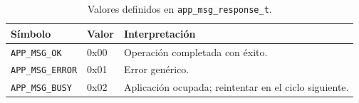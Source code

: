 \begin{table}[htbp]
    \centering
    \caption{Valores definidos en \texttt{app\_msg\_response\_t}.}
    \label{tab:app-msg-response}
    \begin{tabular}{llp{7cm}}
        \toprule
        \textbf{Símbolo} & \textbf{Valor} & \textbf{Interpretación} \\
        \midrule
        \texttt{APP\_MSG\_OK}    & 0x00 & Operación completada con éxito. \\
        \texttt{APP\_MSG\_ERROR} & 0x01 & Error genérico. \\
        \texttt{APP\_MSG\_BUSY}  & 0x02 & Aplicación ocupada; reintentar en el ciclo siguiente. \\
        \bottomrule
    \end{tabular}
\end{table}
